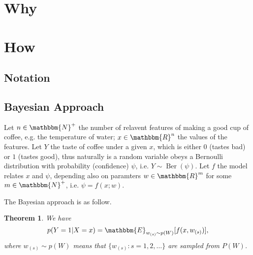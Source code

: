 \documentclass{article}
\newcommand{\tmop}[1]{\ensuremath{\operatorname{#1}}}
\newtheorem{theorem}{Theorem}
\begin{document}
\section{Why}

\section{How}

\subsection{Notation}



\subsection{Bayesian Approach}

Let $n \in \mathbbm{N}^{+}$ the number of relavent features of making a good
cup of coffee, e.g. the temperature of water; $x \in \mathbbm{R}^{n}$ the
values of the features. Let $Y$ the taste of coffee under a given $x$, which
is either $0$ (tastes bad) or $1$ (tastes good), thus naturally is a random
variable obeys a Bernoulli distribution with probability (confidence) $\psi$,
i.e. $Y \sim \tmop{Ber} ( \psi )$. Let $f$ the model relates $x$ and $\psi$,
depending also on paramters $w \in \mathbbm{R}^{m}$ for some $m \in
\mathbbm{N}^{+}$, i.e. $\psi =f ( x;w )$.

The Bayesian approach is as follow.

\begin{theorem}
  We have
  \[ p ( Y=1|X=x ) =\mathbbm{E}_{w_{( s )} \sim p ( W )} [  f ( x,w_{( s )} )
     ] , \]
  where $w_{( s )} \sim p ( W )$ means that $\{ w_{( s )} :s=1,2, \ldots \}$
  are sampled from $P ( W )$.
\end{theorem}
\end{document}
